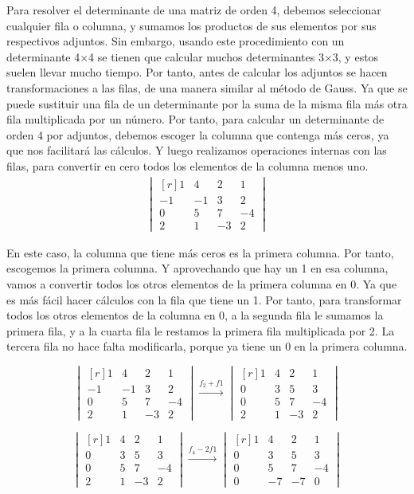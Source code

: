 \documentclass[a4paper, apacite, 12pt, doc]{apa6}
\begin{document}
Para resolver el determinante de una matriz de orden 4, debemos seleccionar cualquier fila o columna, y sumamos los productos de sus elementos por sus respectivos adjuntos.
Sin embargo, usando este procedimiento con un determinante 4×4 se tienen que calcular muchos determinantes 3×3, y estos suelen llevar mucho tiempo. Por tanto, antes de calcular los adjuntos se hacen transformaciones a las filas, de una manera similar al método de Gauss. Ya que se puede sustituir una fila de un determinante por la suma de la misma fila más otra fila multiplicada por un número.
Por tanto, para calcular un determinante de orden 4 por adjuntos, debemos escoger la columna que contenga más ceros, ya que nos facilitará las cálculos. Y luego realizamos operaciones internas con las filas, para convertir en cero todos los elementos de la columna menos uno.
\begin{gather*}
\begin{vmatrix*}[r]
 1 &  4 & 2 & 1\\
-1 & -1 & 3 & 2\\
 0 &  5 & 7 & -4\\
 2 &  1 & -3 & 2
\end{vmatrix*}
\end{gather*}

En este caso, la columna que tiene más ceros es la primera columna. Por tanto, escogemos la primera columna. Y aprovechando que hay un 1 en esa columna, vamos a convertir todos los otros elementos de la primera columna en 0. Ya que es más fácil hacer cálculos con la fila que tiene un 1.
Por tanto, para transformar todos los otros elementos de la columna en 0, a la segunda fila le sumamos la primera fila, y a la cuarta fila le restamos la primera fila multiplicada por 2. La tercera fila no hace falta modificarla, porque ya tiene un 0 en la primera columna.

\[
\begin{vmatrix*}[r]
 1 &  4 & 2 & 1\\
-1 & -1 & 3 & 2\\
 0 &  5 & 7 & -4\\
 2 &  1 & -3 & 2
\end{vmatrix*}
\xrightarrow{f_2 + f1}
\begin{vmatrix*}[r]
 1 &  4 & 2 & 1\\
 0 &  3 & 5 & 3\\
 0 &  5 & 7 & -4\\
 2 &  1 & -3 & 2
\end{vmatrix*}
\]

\[
\begin{vmatrix*}[r]
 1 &  4 & 2 & 1\\
 0 &  3 & 5 & 3\\
 0 &  5 & 7 & -4\\
 2 &  1 & -3 & 2
\end{vmatrix*}
\xrightarrow{f_4 -2f1}
\begin{vmatrix*}[r]
 1 &  4 & 2 & 1\\
 0 &  3 & 5 & 3\\
 0 &  5 & 7 & -4\\
 0 &  -7 & -7 & 0
\end{vmatrix*}
\]
\end{document}
